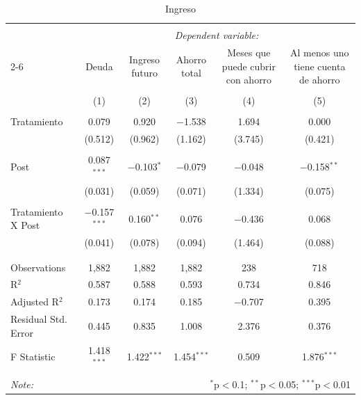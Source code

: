 
\begin{table}[H] \centering 
  \caption{Ingreso} 
  \label{reg_ingreso} 
\tiny 
\begin{tabular}{@{\extracolsep{-7pt}}lccccc} 
\\[-1.8ex]\hline 
\hline \\[-1.8ex] 
 & \multicolumn{5}{c}{\textit{Dependent variable:}} \\ 
\cline{2-6} 
 & Deuda & Ingreso futuro & Ahorro total & Meses que puede cubrir con ahorro & Al menos uno tiene cuenta de ahorro \\ 
\\[-1.8ex] & (1) & (2) & (3) & (4) & (5)\\ 
\hline \\[-1.8ex] 
 Tratamiento & 0.079 & 0.920 & $-$1.538 & 1.694 & 0.000 \\ 
  & (0.512) & (0.962) & (1.162) & (3.745) & (0.421) \\ 
  & & & & & \\ 
 Post & 0.087$^{***}$ & $-$0.103$^{*}$ & $-$0.079 & $-$0.048 & $-$0.158$^{**}$ \\ 
  & (0.031) & (0.059) & (0.071) & (1.334) & (0.075) \\ 
  & & & & & \\ 
 Tratamiento X Post & $-$0.157$^{***}$ & 0.160$^{**}$ & 0.076 & $-$0.436 & 0.068 \\ 
  & (0.041) & (0.078) & (0.094) & (1.464) & (0.088) \\ 
  & & & & & \\ 
\hline \\[-1.8ex] 
Observations & 1,882 & 1,882 & 1,882 & 238 & 718 \\ 
R$^{2}$ & 0.587 & 0.588 & 0.593 & 0.734 & 0.846 \\ 
Adjusted R$^{2}$ & 0.173 & 0.174 & 0.185 & $-$0.707 & 0.395 \\ 
Residual Std. Error & 0.445 & 0.835 & 1.008 & 2.376 & 0.376 \\ 
F Statistic & 1.418$^{***}$ & 1.422$^{***}$ & 1.454$^{***}$ & 0.509 & 1.876$^{***}$ \\ 
\hline 
\hline \\[-1.8ex] 
\textit{Note:}  & \multicolumn{5}{r}{$^{*}$p$<$0.1; $^{**}$p$<$0.05; $^{***}$p$<$0.01} \\ 
\end{tabular} 
\end{table} 
